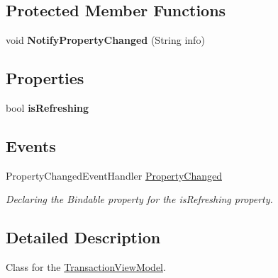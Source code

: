 \subsection*{Protected Member Functions}
\begin{DoxyCompactItemize}
\item 
\mbox{\label{class_pocket_saver_1_1_view_models_1_1_transaction_1_1_transaction_view_model_a322474d9390bb1c47b9b73f76e2aa519}} 
void {\bfseries Notify\+Property\+Changed} (String info)
\end{DoxyCompactItemize}
\subsection*{Properties}
\begin{DoxyCompactItemize}
\item 
\mbox{\label{class_pocket_saver_1_1_view_models_1_1_transaction_1_1_transaction_view_model_a05bc69b164fa7d830f71a76fbbc0aab3}} 
bool {\bfseries is\+Refreshing}
\end{DoxyCompactItemize}
\subsection*{Events}
\begin{DoxyCompactItemize}
\item 
Property\+Changed\+Event\+Handler \hyperlink{class_pocket_saver_1_1_view_models_1_1_transaction_1_1_transaction_view_model_a258c2b7249a3e23d71d6669ef91d46bd}{Property\+Changed}
\begin{DoxyCompactList}\small\item\em Declaring the Bindable property for the is\+Refreshing property. \end{DoxyCompactList}\end{DoxyCompactItemize}


\subsection{Detailed Description}
Class for the \hyperlink{class_pocket_saver_1_1_view_models_1_1_transaction_1_1_transaction_view_model}{Transaction\+View\+Model}. 




